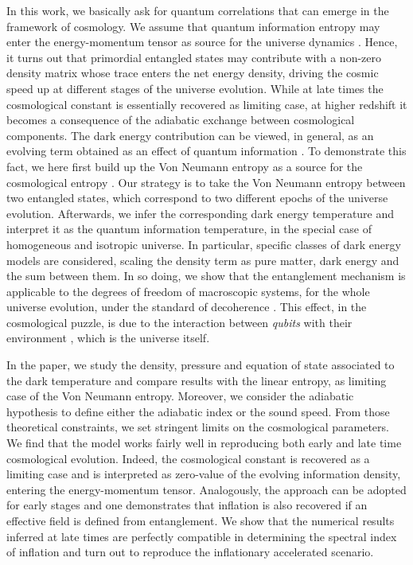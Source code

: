 \documentclass[nofootinbib,prd,superscriptaddress,showpacs,showkeys,]{revtex4}
\begin{document}
In this work, we basically ask for  quantum correlations that can emerge   in  the framework of  cosmology. We assume that quantum information entropy may enter the  energy-momentum tensor as source for the universe dynamics \cite{cosmoenta}. Hence, it turns out that primordial entangled states may contribute with a non-zero density matrix whose trace enters the net energy density, driving the cosmic speed up at different stages of the universe evolution. While at late times the cosmological constant is essentially recovered as limiting case, at higher redshift it becomes a consequence of the adiabatic exchange between cosmological components. The dark energy contribution can be viewed, in general, as an evolving term obtained  as an effect of quantum information \cite{cosmoenta2}. To demonstrate this fact, we here first build up the Von Neumann entropy as a source for the cosmological entropy \cite{cosmoenta3}. Our strategy is to take the Von Neumann entropy between two entangled states, which correspond to two different epochs of the universe evolution. Afterwards, we infer the corresponding dark energy temperature and  interpret it as the quantum information temperature, in the special case of homogeneous and isotropic universe. In particular, specific classes of dark energy models  are  considered, scaling the density term as pure matter, dark energy and the sum between them. In so doing, we  show that the entanglement mechanism is applicable  to the  degrees of freedom  of macroscopic systems, for the whole  universe evolution, under the standard  of decoherence \cite{sett}. This effect, in the cosmological puzzle, is due to the interaction between {\it qubits} with their environment \cite{sett2}, which is the universe itself.

In the paper, we study the density, pressure and equation of state associated to the dark temperature and  compare  results with the  linear entropy, as limiting case of the Von Neumann entropy. Moreover, we consider the adiabatic hypothesis to define either the adiabatic index or the sound speed. From those theoretical constraints, we set stringent limits on the cosmological  parameters. We find that the model works fairly well in reproducing both early and late time cosmological  evolution. Indeed, the cosmological constant is recovered as a limiting case and is interpreted as zero-value of the evolving information density, entering the energy-momentum tensor. Analogously, the  approach can be adopted for early stages and one demonstrates that inflation is also recovered if an effective field is defined from entanglement. We show that the numerical results inferred at late times are perfectly compatible in determining the spectral index of inflation and turn out to reproduce the inflationary accelerated scenario.
\end{document}
